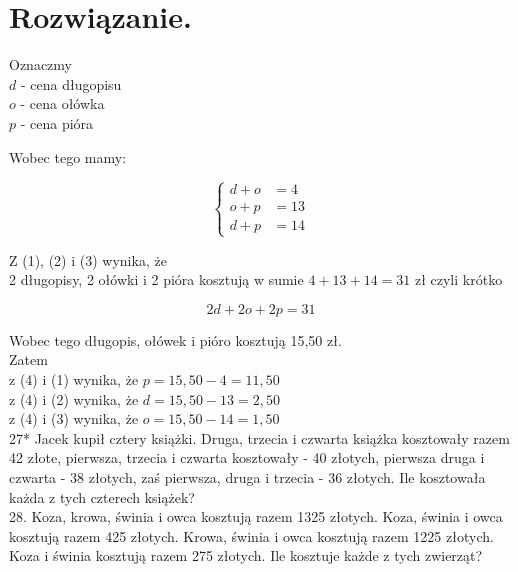 \documentclass[10pt]{article}
\begin{document}
\section*{Rozwiązanie.}
Oznaczmy\\
\(d\) - cena długopisu\\
\(o\) - cena ołówka\\
\(p\) - cena pióra

Wobec tego mamy:

\[
\left\{\begin{aligned}
d+o & =4 \\
o+p & =13 \\
d+p & =14
\end{aligned}\right.
\]

Z (1), (2) i (3) wynika, że\\
2 długopisy, 2 ołówki i 2 pióra kosztują w sumie \(4+13+14=31\) zł czyli krótko

\[
2 d+2 o+2 p=31
\]

Wobec tego długopis, ołówek i pióro kosztują 15,50 zł.\\
Zatem\\
z (4) i (1) wynika, że \(p=15,50-4=11,50\)\\
z (4) i (2) wynika, że \(d=15,50-13=2,50\)\\
z (4) i (3) wynika, że \(o=15,50-14=1,50\)\\
27* Jacek kupił cztery książki. Druga, trzecia i czwarta książka kosztowały razem 42 złote, pierwsza, trzecia i czwarta kosztowały - 40 złotych, pierwsza druga i czwarta - 38 złotych, zaś pierwsza, druga i trzecia - 36 złotych. Ile kosztowała każda z tych czterech książek?\\
28. Koza, krowa, świnia i owca kosztują razem 1325 złotych. Koza, świnia i owca kosztują razem 425 złotych. Krowa, świnia i owca kosztują razem 1225 złotych. Koza i świnia kosztują razem 275 złotych. Ile kosztuje każde z tych zwierząt?
\end{document}
